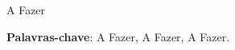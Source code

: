 \setlength{\absparsep}{18pt} %
\begin{resumo}
 
A Fazer 

 \textbf{Palavras-chave}: A Fazer, A Fazer, A Fazer.
\end{resumo}